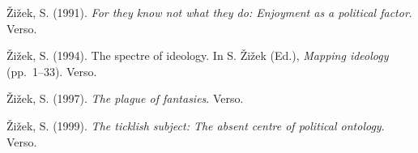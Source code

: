 \documentclass[pdflatex,sn-apa]{sn-jnl}
\begin{document}
\noindent\hangindent=0.5in Žižek, S. (1991). \emph{For they know not what they do: Enjoyment as a political factor}. Verso.\par\medskip

\noindent\hangindent=0.5in Žižek, S. (1994). The spectre of ideology. In S. Žižek (Ed.), \emph{Mapping ideology} (pp.~1--33). Verso.\par\medskip

\noindent\hangindent=0.5in Žižek, S. (1997). \emph{The plague of fantasies}. Verso.\par\medskip

\noindent\hangindent=0.5in Žižek, S. (1999). \emph{The ticklish subject: The absent centre of political ontology}. Verso.\par\medskip

\endgroup
\end{document}
